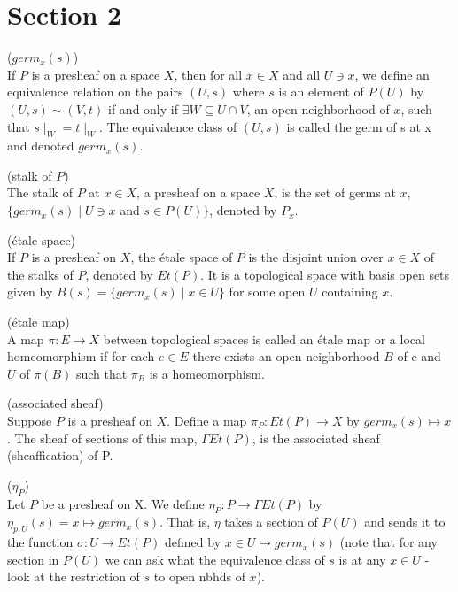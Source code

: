 \newpage
\section*{Section 2}

\begin{definition*}
		($germ_x(s)$)\\ If $P$ is a presheaf on a space $X$, then for all $x \in X$ and all $U \ni x$, we define an equivalence relation on the pairs $(U,s)$ where $s$ is an element of $P(U)$ by $(U,s) \sim (V,t)$ if and only if $\exists W \subseteq U \cap V$, an open neighborhood of $x$, such that $s \mid_W = t \mid_W$. The equivalence class of $(U,s)$ is called the germ of s at x and denoted $germ_x(s)$.
\end{definition*}

\begin{definition*}
	(stalk of $P$)\\ The stalk of $P$ at $x \in X$, a presheaf on a space $X$, is the set of germs at $x$, $\{germ_x(s) \mid U \ni x$ and $s \in P(U)\}$, denoted by $P_x$.
\end{definition*}

\begin{definition*}
	(\'etale space) \\ If $P$ is a presheaf on $X$, the \'etale space of $P$ is the disjoint union over $x \in X$ of the stalks of $P$, denoted by $Et(P)$. It is a topological space with basis open sets given by $B(s) = \{germ_x(s) \mid x \in U\}$ for some open $U$ containing $x$. 
\end{definition*}

\begin{definition*}
	(\'etale map)\\ A map $\pi: E \rightarrow X$ between topological spaces is called an \'etale map or a local homeomorphism if for each $e \in E$ there exists an open neighborhood $B$ of e and $U$ of $\pi(B)$ such that $\pi_B$ is a homeomorphism. 
\end{definition*}
	
\begin{definition*}
	(associated sheaf)\\ Suppose $P$ is a presheaf on $X$. Define a map $\pi_P: Et(P) \rightarrow X$ by $germ_x(s) \mapsto x$. The sheaf of sections of this map, $\Gamma Et(P)$, is the associated sheaf (sheaffication) of P.
\end{definition*}

\begin{definition*}
	($\eta_P$)\\ Let $P$ be a presheaf on X. We define $\eta_P: P \rightarrow \Gamma Et(P)$ by $\eta_{p,U}(s) = x \mapsto germ_x(s)$. That is, $\eta$ takes a section of $P(U)$ and sends it to the function $\sigma: U \rightarrow Et(P)$ defined by $x \in U \mapsto germ_x(s)$ (note that for any section in $P(U)$ we can ask what the equivalence class of $s$ is at any $x \in U$ - look at the restriction of $s$ to open nbhds of $x$). 
\end{definition*}

